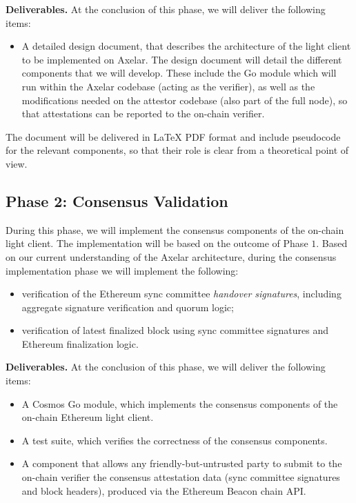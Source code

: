 \noindent
\textbf{Deliverables.} At the conclusion of this phase, we will deliver the following items:

\begin{itemize}
    \item A detailed design document, that describes the architecture of the light client to be implemented on Axelar. The design document will detail the different components that we will develop. These include the Go module which will run within the Axelar codebase (acting as the verifier), as well as the modifications needed on the attestor codebase (also part of the full node), so that attestations can be reported to the on-chain verifier.
\end{itemize}

The document will be delivered in LaTeX PDF format and include pseudocode for the relevant components, so that their role is clear from a theoretical point of view.

\subsection{Phase 2: Consensus Validation}

During this phase, we will implement the consensus components of the on-chain light client. The implementation will be based on the outcome of Phase $1$. Based on our current understanding of the Axelar architecture, during the consensus implementation phase we will implement the following:
\begin{itemize}
    \item verification of the Ethereum sync committee \emph{handover signatures}, including aggregate signature verification and quorum logic;
    \item verification of latest finalized block using sync committee signatures and Ethereum finalization logic.
\end{itemize}

\noindent
\textbf{Deliverables.} At the conclusion of this phase, we will deliver the following items:

\begin{itemize}
    \item A Cosmos Go module, which implements the consensus components of the on-chain Ethereum light client.
    \item A test suite, which verifies the correctness of the consensus components.
    \item A component that allows any friendly-but-untrusted party to submit to the on-chain verifier the consensus attestation data (sync committee signatures and block headers), produced via the Ethereum Beacon chain API.
\end{itemize}

